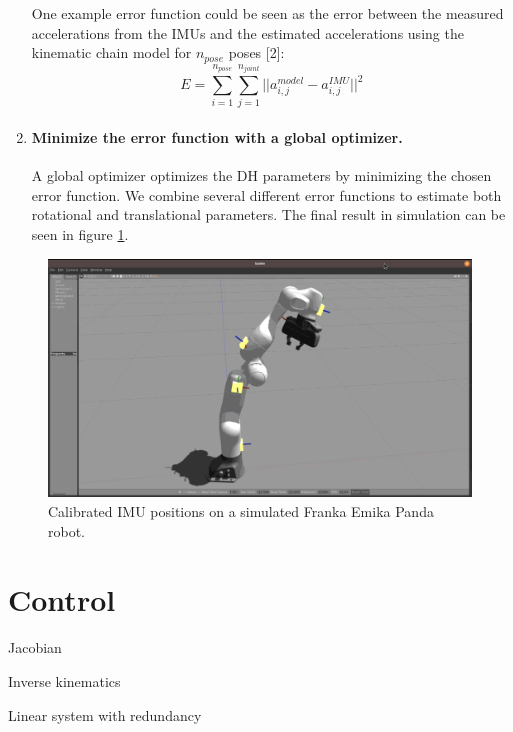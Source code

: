 \begin{enumerate}
    One example error function could be seen as the error between the measured accelerations from the IMUs and the estimated accelerations using the kinematic chain model for $n_{pose}$ poses [2]:
    $$E = \sum_{i=1}^{n_{pose}} \sum_{j=1}^{n_{joint}} ||a^{model}_{i,j} - a^{IMU}_{i,j}||^2$$

    \item \paragraph{Minimize the error function with a global optimizer.}
    A global optimizer optimizes the DH parameters by minimizing the chosen error function. We combine several different error functions to estimate both rotational and translational parameters. The final result in simulation can be seen in figure \ref{fig:calibration_result}.

\end{enumerate}

\begin{figure}[htbp]
    \caption[Calibration result]{
    Calibrated IMU positions on a simulated Franka Emika Panda robot.
    }
    \begin{center}
    \includegraphics[width=140mm]{figs/calibration_result.png}
    \end{center}
\label{fig:calibration_result}
\end{figure}

\section{Control}
\label{s:control}

Jacobian

Inverse kinematics

Linear system with redundancy
